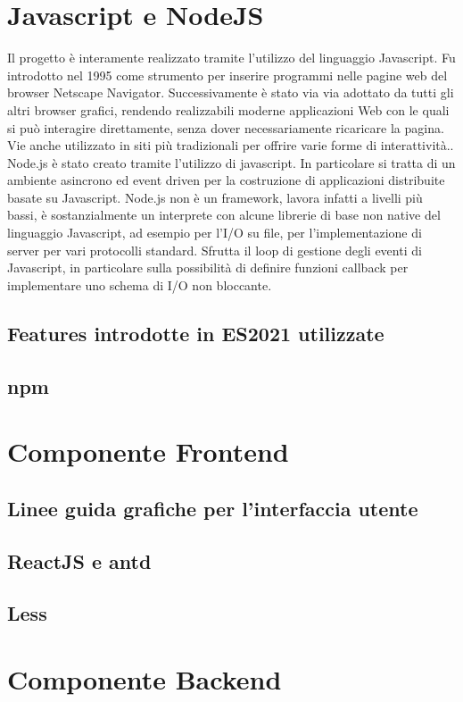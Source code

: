 \section{Javascript e NodeJS}
Il progetto è interamente realizzato tramite l'utilizzo del linguaggio Javascript. Fu introdotto nel 1995 come strumento per inserire programmi nelle pagine web del browser Netscape Navigator. Successivamente è stato via via adottato da tutti gli altri browser grafici, rendendo realizzabili moderne applicazioni Web con le quali si può interagire direttamente, senza dover necessariamente ricaricare la pagina. Vie anche utilizzato in siti più tradizionali per offrire varie forme di interattività.\cite{JS}. Node.js è stato creato tramite l'utilizzo di javascript. In particolare si tratta di un ambiente asincrono ed event driven per la costruzione di applicazioni distribuite basate su Javascript. Node.js non è un framework, lavora infatti a livelli più bassi, è sostanzialmente un 
interprete con alcune librerie di base non native del linguaggio Javascript, ad esempio per l’I/O su file, per l’implementazione di 
server per vari protocolli standard. Sfrutta il loop di gestione degli eventi di Javascript, in particolare sulla possibilità 
di definire funzioni callback per implementare uno schema di I/O non 
bloccante.
\subsection{Features introdotte in ES2021 utilizzate}
\subsection{npm}
\newpage
\section{Componente Frontend}
\subsection{Linee guida grafiche per l'interfaccia utente}
\subsection{ReactJS e antd}
\subsection{Less}
\newpage
\section{Componente Backend}
